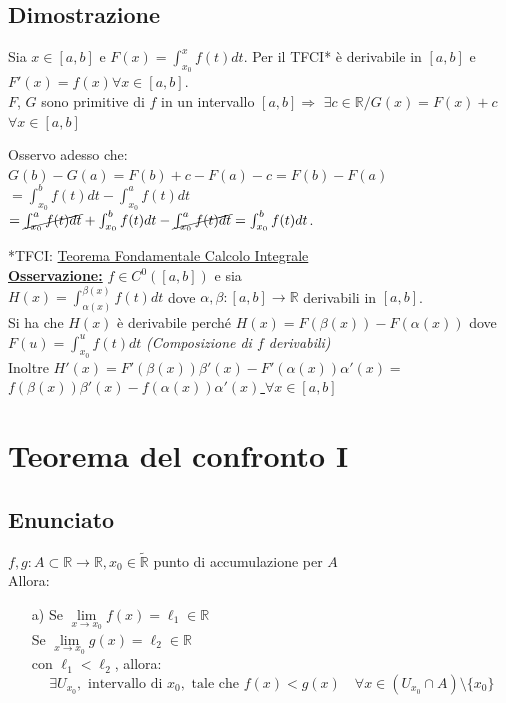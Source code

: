 \documentclass{article}
\newcommand{\R}{\mathbb{R}}
\newcommand{\Rext}{\widetilde{\mathbb{R}}}
\newcommand{\vSpace}{\vspace{1em}}
\begin{document}
\begin{flushleft}
\subsection{Dimostrazione}
Sia $x \in [a,b]$ e $F(x)= \int_{x_0}^{x}f(t)dt$. Per il TFCI* è derivabile in $[a,b]$ e $F'(x)=f(x) \forall x \in [a,b]$.
\\$F$, $G$ sono primitive di $f$ in un intervallo $[a,b] \Rightarrow$ $\exists c \in {\R} /G(x)=F(x)+c$ $\forall x \in [a,b]$
\begin{center}
    Osservo adesso che: $G(b) - G(a) = F(b)+c-F(a)-c=F(b)-F(a)$
    \\$= \int_{x_0}^{b}f(t)dt - \int_{x_0}^{a}f(t)dt$
    \\$= \cancel{\int_{x_0}^{a}f(t)dt} + \int_{x_0}^{b}f(t)dt - \cancel{\int_{x_0}^{a}f(t)dt} = \int_{x_0}^{b}f(t)dt$.
\end{center}
*TFCI: \hyperref[TFCI]{Teorema Fondamentale Calcolo Integrale}
\vSpace
\\\underline{\textbf{Osservazione:}} $f \in C^0 ([a,b])$ e sia
\\$H(x) = \int_{\alpha(x)}^{\beta(x)}f(t)dt$ dove $\alpha,\beta:[a,b]\rightarrow \R$ derivabili in $[a,b]$.
\\Si ha che $H(x)$ è derivabile perché $H(x)=F(\beta(x))-F(\alpha(x))$ dove $F(u)=\int_{x_0}^{u}f(t)dt$ \textit{(Composizione di $f$ derivabili)}
\\Inoltre $H'(x)=F'(\beta(x))\beta'(x) - F'(\alpha(x))\alpha'(x) = $ \underline{$f(\beta (x))\beta'(x)-f(\alpha(x))\alpha'(x)$ $\forall x \in [a,b]$}


\section{Teorema del confronto I}
\subsection{Enunciato}
$f, g: A \subset \R \rightarrow \R, x_0 \in \Rext$ punto di accumulazione per $A$
\\Allora: 

\begin{enumerate}
    \item[a)] Se \( \lim\limits_{x \to x_0} f(x) = \ell_1 \in \mathbb{R} \) \\
          Se \( \lim\limits_{x \to x_0} g(x) = \ell_2 \in \mathbb{R} \) \\
          con \( \ell_1 < \ell_2 \), allora:
          \[
          \exists U_{x_0}, \text{ intervallo di } x_0, \text{ tale che } f(x) < g(x) \quad \forall x \in (U_{x_0} \cap A) \setminus \{x_0\}
          \]
    

\end{enumerate}
\end{flushleft}
\end{document}
